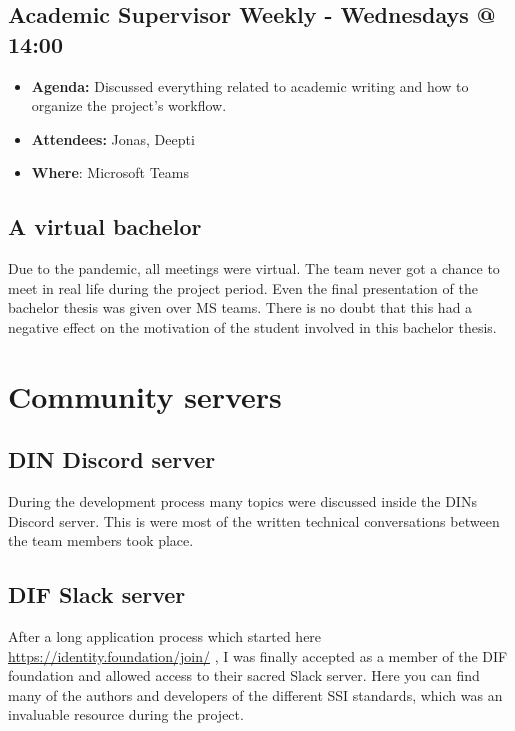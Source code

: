 \hypertarget{academic-supervisor-weekly---wednesdays-1400}{%
\subsection{Academic Supervisor Weekly - Wednesdays @
14:00}\label{academic-supervisor-weekly---wednesdays-1400}}

\begin{itemize}
\tightlist
\item
  \textbf{Agenda:} Discussed everything related to academic writing and
  how to organize the project's workflow.
\item
  \textbf{Attendees:} Jonas, Deepti
\item
  \textbf{Where}: Microsoft Teams
\end{itemize}


\hypertarget{a-virtual-bachelor}{%
\subsection{A virtual bachelor}\label{a-virtual-bachelor}}

Due to the pandemic, all meetings were virtual. The team never got a
chance to meet in real life during the project period. Even the final
presentation of the bachelor thesis was given over MS teams. There is no
doubt that this had a negative effect on the motivation of the student
involved in this bachelor thesis.


\hypertarget{community-servers}{%
\section{Community servers}\label{community-servers}}

\subsection{DIN Discord server}

During the development process many topics were discussed inside the
DINs Discord server. This is were most of the written technical
conversations between the team members took place.

\subsection{DIF Slack server}

After a long application process which started here
\url{https://identity.foundation/join/} , I was finally accepted as a
member of the DIF foundation and allowed access to their sacred Slack
server. Here you can find many of the authors and developers of the
different SSI standards, which was an invaluable resource during the
project.



